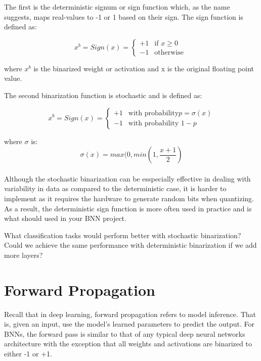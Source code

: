 The first is the deterministic signum or sign function which, as the name suggests, maps real-values to -1 or 1 based on their sign. The sign function is defined as:

\begin{equation}
x^{b} = Sign(x) =
    \begin{cases}
        +1 & \text{if } x \geq{0} \\
        -1 & \text{otherwise }
    \end{cases}
\end{equation}

where $x^{b}$ is the binarized weight or activation and x is the original floating point value. 
\newpage

The second binarization function is stochastic and is defined as:

\begin{equation}
x^{b} = Sign(x) =
    \begin{cases}
        +1 & \text{with probability} p = \sigma(x) \\
        -1 & \text{with probability } 1-p
    \end{cases}
\end{equation}

where $\sigma$ is:
\begin{equation}
    \sigma (x)= max(0, min(1, \frac{x+1}{2})
\end{equation}
\\

Although the stochastic binarization can be esspecially effective in dealing with variability in data as compared to the deterministic case, it is harder to implement as it requires the hardware to generate random bits when quantizing. As a result, the deterministic sign function is more often used in practice and is what should used in your BNN project. 

\begin{exercise}
What classification tasks would perform better with stochastic binarization? Could we achieve the same performance with deterministic binarization if we add more layers?
\end{exercise}


\section{Forward Propagation}
Recall that in deep learning, forward propagation refers to model inference. That is, given an input, use the model's learned parameters to predict the output. For BNNs, the forward pass is similar to that of any typical deep neural networks architecture with the exception that all weights and activations are binarized to either -1 or +1. 

